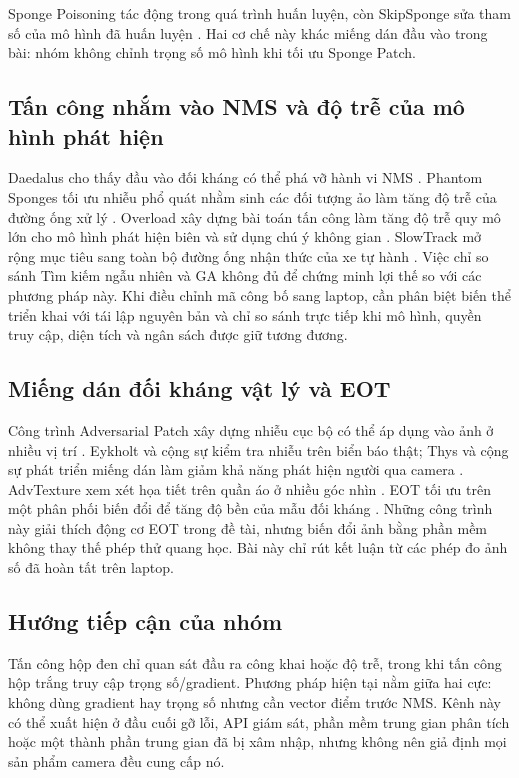 \documentclass[a4paper,fleqn]{cas-dc}
\begin{document}
Sponge Poisoning tác động trong quá trình huấn luyện, còn SkipSponge sửa tham số của mô hình đã huấn luyện \cite{cina2022,lintelo2024}. Hai cơ chế này khác miếng dán đầu vào trong bài: nhóm không chỉnh trọng số mô hình khi tối ưu Sponge Patch.

\subsection{Tấn công nhắm vào NMS và độ trễ của mô hình phát hiện}

Daedalus cho thấy đầu vào đối kháng có thể phá vỡ hành vi NMS \cite{wang2021daedalus}. Phantom Sponges tối ưu nhiễu phổ quát nhằm sinh các đối tượng ảo làm tăng độ trễ của đường ống xử lý \cite{shapira2023}. Overload xây dựng bài toán tấn công làm tăng độ trễ quy mô lớn cho mô hình phát hiện biên và sử dụng chú ý không gian \cite{chen2024overload}. SlowTrack mở rộng mục tiêu sang toàn bộ đường ống nhận thức của xe tự hành \cite{ma2024slowtrack}. Việc chỉ so sánh Tìm kiếm ngẫu nhiên và GA không đủ để chứng minh lợi thế so với các phương pháp này. Khi điều chỉnh mã công bố sang laptop, cần phân biệt biến thể triển khai với tái lập nguyên bản và chỉ so sánh trực tiếp khi mô hình, quyền truy cập, diện tích và ngân sách được giữ tương đương.

\subsection{Miếng dán đối kháng vật lý và EOT}

Công trình Adversarial Patch xây dựng nhiễu cục bộ có thể áp dụng vào ảnh ở nhiều vị trí \cite{brown2017}. Eykholt và cộng sự kiểm tra nhiễu trên biển báo thật; Thys và cộng sự phát triển miếng dán làm giảm khả năng phát hiện người qua camera \cite{eykholt2018,thys2019}. AdvTexture xem xét họa tiết trên quần áo ở nhiều góc nhìn \cite{hu2022}. EOT tối ưu trên một phân phối biến đổi để tăng độ bền của mẫu đối kháng \cite{athalye2018}. Những công trình này giải thích động cơ EOT trong đề tài, nhưng biến đổi ảnh bằng phần mềm không thay thế phép thử quang học. Bài này chỉ rút kết luận từ các phép đo ảnh số đã hoàn tất trên laptop.

\subsection{Hướng tiếp cận của nhóm}

Tấn công hộp đen chỉ quan sát đầu ra công khai hoặc độ trễ, trong khi tấn công hộp trắng truy cập trọng số/gradient. Phương pháp hiện tại nằm giữa hai cực: không dùng gradient hay trọng số nhưng cần vector điểm trước NMS. Kênh này có thể xuất hiện ở đầu cuối gỡ lỗi, API giám sát, phần mềm trung gian phân tích hoặc một thành phần trung gian đã bị xâm nhập, nhưng không nên giả định mọi sản phẩm camera đều cung cấp nó.
\end{document}
